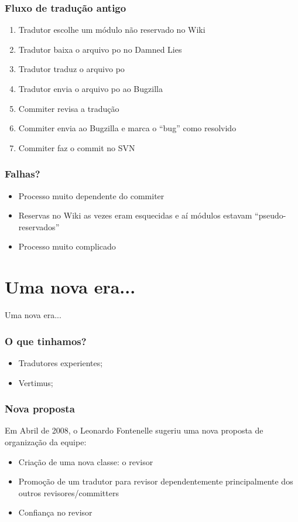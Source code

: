 \documentclass{beamer}
\begin{document}
\begin{frame}
    \frametitle{Fluxo de tradução antigo}
    \begin{enumerate}[<+->]
        \item Tradutor escolhe um módulo não reservado no Wiki
        \item Tradutor baixa o arquivo po no Damned Lies
        \item Tradutor traduz o arquivo po
        \item Tradutor envia o arquivo po ao Bugzilla
        \item Commiter revisa a tradução 
        \item Commiter envia ao Bugzilla e marca o ``bug'' como resolvido
        \item Commiter faz o commit no SVN
    \end{enumerate}
\end{frame}

\begin{frame}
    \frametitle{Falhas?}
    \begin{itemize}[<+->]
        \item Processo muito dependente do commiter
        \item Reservas no Wiki as vezes eram esquecidas e aí módulos estavam ``pseudo-reservados''
        \item Processo muito complicado
    \end{itemize}
\end{frame}

\section{Uma nova era...}

\begin{frame}
  \centering
  \Huge{Uma nova era...}
\end{frame}


\begin{frame}
    \frametitle{O que tinhamos?}
    \begin{itemize}[<+->]
        \item Tradutores experientes;
        \item Vertimus;
    \end{itemize}
\end{frame}

\begin{frame}
    \frametitle{Nova proposta}  
    Em Abril de 2008, o Leonardo Fontenelle sugeriu uma nova proposta de organização da equipe:
    \begin{itemize}[<+->]
        \item Criação de uma nova classe: o revisor
        \item Promoção de um tradutor para revisor dependentemente principalmente dos outros revisores/committers
        \item Confiança no revisor
    \end{itemize}
\end{frame}
\end{document}
